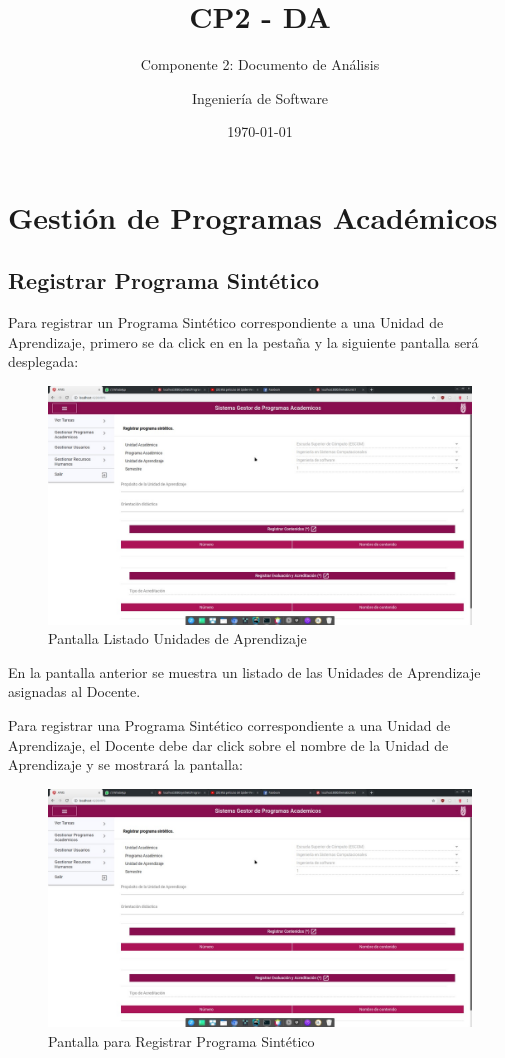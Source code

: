 \documentclass[10pt]{book}
\title{CP2 - DA}
\subtitle{Componente 2: Documento de Análisis}
\author{Ingeniería de Software}
\date{\today}
\begin{document}
\maketitle
\thispagestyle{empty}
\tableofcontents




\chapter{Gestión de Programas Académicos}
\section{Registrar Programa Sintético}
Para registrar un Programa Sintético correspondiente a una Unidad de Aprendizaje, primero se da click en en la pestaña  y la siguiente pantalla será desplegada:

\begin{figure}[!hbtp]
    \centering
    \hypertarget{2}{\includegraphics[width=0.5\linewidth]{images/SP6/1.jpeg}}
    \caption{Pantalla Listado Unidades de Aprendizaje} 
\end{figure}

En la pantalla anterior se muestra un listado de las Unidades de Aprendizaje asignadas al Docente.

Para registrar una Programa Sintético correspondiente a una Unidad de Aprendizaje, el Docente debe dar click sobre el nombre de la Unidad de Aprendizaje y se mostrará la pantalla:

\pagebreak
\begin{figure}[!hbtp]
    \centering
    \includegraphics[width=0.5\linewidth]{images/SP6/1.jpeg}
    \caption{Pantalla para Registrar Programa Sintético}
\end{figure}
\end{document}
